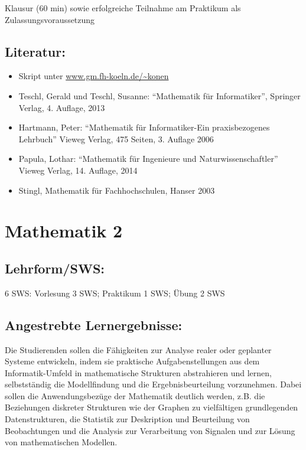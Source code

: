 Klausur (60 min) sowie erfolgreiche Teilnahme am Praktikum als
Zulassungsvoraussetzung

\section*{Literatur:}\label{literatur-10}

\begin{itemize}
\item
  Skript unter \url{www.gm.fh-koeln.de/~konen}
\item
  Teschl, Gerald und Teschl, Susanne: ``Mathematik für Informatiker'',
  Springer Verlag, 4. Auflage, 2013
\item
  Hartmann, Peter: ``Mathematik für Informatiker-Ein praxisbezogenes
  Lehrbuch'' Vieweg Verlag, 475 Seiten, 3. Auflage 2006
\item
  Papula, Lothar: ``Mathematik für Ingenieure und Naturwissenschaftler''
  Vieweg Verlag, 14. Auflage, 2014
\item
  Stingl, Mathematik für Fachhochschulen, Hanser 2003
\end{itemize}

\chapter{Mathematik 2}\label{mathematik-2}

\section*{Lehrform/SWS:}\label{lehrformsws-10}

6 SWS: Vorlesung 3 SWS; Praktikum 1 SWS; Übung 2 SWS

\section*{Angestrebte
Lernergebnisse:}\label{angestrebte-lernergebnisse-14}

Die Studierenden sollen die Fähigkeiten zur Analyse realer oder
geplanter Systeme entwickeln, indem sie praktische Aufgabenstellungen
aus dem Informatik-Umfeld in mathematische Strukturen abstrahieren und
lernen, selbstständig die Modellfindung und die Ergebnisbeurteilung
vorzunehmen. Dabei sollen die Anwendungsbezüge der Mathematik deutlich
werden, z.B. die Beziehungen diskreter Strukturen wie der Graphen zu
vielfältigen grundlegenden Datenstrukturen, die Statistik zur
Deskription und Beurteilung von Beobachtungen und die Analysis zur
Verarbeitung von Signalen und zur Lösung von mathematischen Modellen.

